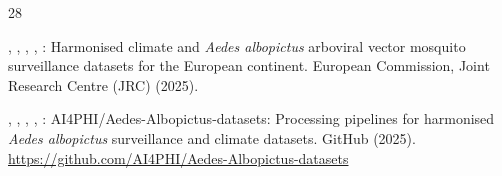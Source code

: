 \documentclass[11pt]{article}
\begin{document}
\begin{thebibliography}{28}
\begin{botherref}
,
,
,
,
:
Harmonised climate and \textit{{Aedes} albopictus} arboviral vector mosquito surveillance datasets for the {European} continent.
European Commission, Joint Research Centre (JRC)
(2025).
\end{botherref}
\endbibitem

\begin{botherref}
,
,
,
,
:
{AI4PHI/Aedes-Albopictus-datasets}: Processing pipelines for harmonised \textit{{Aedes} albopictus} surveillance and climate datasets.
GitHub
(2025).
\url{https://github.com/AI4PHI/Aedes-Albopictus-datasets}
\end{botherref}
\endbibitem

\end{thebibliography}
\end{document}
